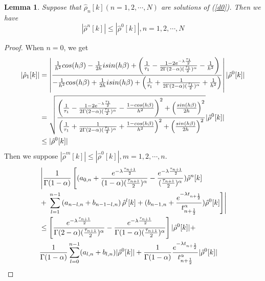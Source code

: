 \documentclass[10pt, reqno]{amsart}
\newtheorem{lmm}{\bf Lemma}
\newenvironment{lemma}{\begin{lmm}}{\end{lmm}}
\theoremstyle{remark}
\theoremstyle{definition}
\numberwithin{table}{section}
\begin{document}
\begin{lemma}\label{dnd0}
    Suppose that $\hat{\rho}_{n}[k] (n = 1,  2, \cdots,  N)$ are solutions of (\ref{d0}).  Then we have
    $$
    |\hat{\rho}^{n}[k]|\leq |\hat{\rho}^{0}[k]|, n = 1,  2, \cdots,  N
    $$
\end{lemma}
\begin{proof}
When $n=0$, we get
\begin{align}
    |\hat{\rho}_{1}[k]|&=\left|\frac{\frac{1}{h^2}cos(h\beta)-\frac{1}{2h}isin(h\beta)+\left(\frac{1}{\tau_{1}}-\frac{1-2e^{-\lambda \frac{\tau_{1}}{2}}}{2\Gamma(2-\alpha)(\frac{\tau_{1}}{2})^\alpha}-\frac{1}{h^2}\right) }{-\frac{1}{h^2}cos(h\beta)+\frac{1}{2h}isin(h\beta)+\left(\frac{1}{\tau_{1}}+\frac{1}{2\Gamma(2-\alpha)(\frac{\tau_{1}}{2})^\alpha}+\frac{1}{h^2}\right) }\right||\hat{\rho}^{0}[k]| \notag\\
    &=\sqrt{\frac{\left( \frac{1}{\tau_1}-\frac{1-2e^{-\lambda \frac{\tau_{1}}{2}}}{2\Gamma(2-\alpha)(\frac{\tau_{1}}{2})^\alpha}-\frac{1-cos(h\beta)}{h^2}\right)^2+\left(\frac{sin(h\beta)}{2h}\right)^2}{\left( \frac{1}{\tau_1}+\frac{1}{2\Gamma(2-\alpha)(\frac{\tau_{1}}{2})^\alpha}+\frac{1-cos(h\beta)}{h^2}\right)^2+\left(\frac{sin(h\beta)}{2h}\right)^2}}|\hat{\rho}^{0}[k]| \notag\\
    &\leq |\hat{\rho}^{0}[k]|
\end{align}
Then we suppose $|\hat{\rho}^{m}[k]|\leq |\hat{\rho}^{0}[k]|, m=1, 2, \cdots, n$. 
\begin{align}
    &\left|\frac{1}{\Gamma(1-\alpha)}\left[(a_{0, n} +\frac{e^{-\lambda \frac{\tau_{n+1}}{2}}}{(1-\alpha)(\frac{\tau_{n+1}}{2})^\alpha}-\frac{e^{-\lambda \frac{\tau_{n+1}}{2}}}{(\frac{\tau_{n+1}}{2})^\alpha})\hat{\rho}^{n}[k]\right.\right.\notag\\
    &+\left.\left.\sum\limits_{l=1}^{n-1} \left(a_{n-l, n}+b_{n-1-l, n}\right) \hat{\rho}^{l}[k]+(b_{n-1, n}+\frac{e^{-\lambda t_{n+\frac{1}{2}}}}{t_{n+\frac{1}{2}}^\alpha}) \hat{\rho}^{0}[k]\right]\right|\notag\\
    &\leq \left[\frac{e^{-\lambda \frac{\tau_{n+1}}{2}}}{\Gamma(2-\alpha)(\frac{\tau_{n+1}}{2})^\alpha}-\frac{e^{-\lambda \frac{\tau_{n+1}}{2}}}{\Gamma(1-\alpha)(\frac{\tau_{n+1}}{2})^\alpha}\right]|\hat{\rho}^{0}[k]|+ \notag\\
    &\frac{1}{\Gamma(1-\alpha)}\sum_{l=0}^{n-1}(a_{l, n}+b_{l, n})|\hat{\rho}^{0}[k]|+\frac{1}{\Gamma(1-\alpha)}\frac{e^{-\lambda t_{n+\frac{1}{2}}}}{t_{n+\frac{1}{2}}^\alpha} |\hat{\rho}^{0}[k]| \label{dn}
\end{align}

\end{proof}
\end{document}

